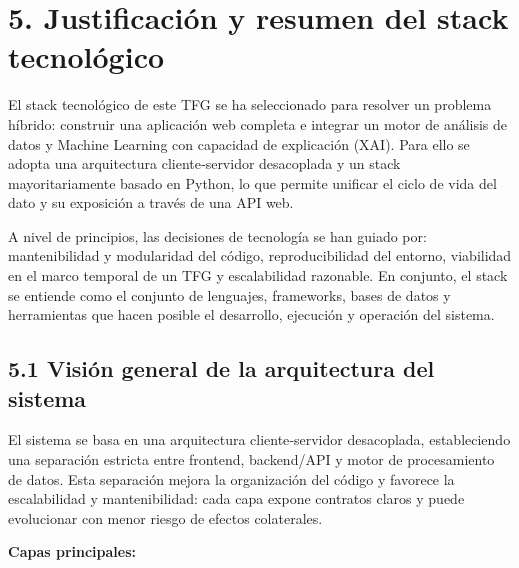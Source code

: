\section*{5. Justificación y resumen del stack tecnológico}

El stack tecnológico de este TFG se ha seleccionado para resolver un problema 
híbrido: construir una aplicación web completa e
integrar un motor de análisis de datos y Machine Learning con capacidad de 
explicación (XAI). Para ello se adopta una arquitectura cliente‑servidor desacoplada 
y un stack mayoritariamente basado en Python, lo que permite unificar el ciclo de 
vida del dato y su exposición a través de 
una API web.

A nivel de principios, las decisiones de tecnología se han guiado por: 
mantenibilidad y modularidad del código, reproducibilidad del entorno, 
viabilidad en el marco temporal de un TFG y escalabilidad razonable. En 
conjunto, el stack se entiende como el conjunto de lenguajes, frameworks, bases 
de datos y herramientas que hacen posible el desarrollo, ejecución y operación 
del sistema.

\subsection{5.1 Visión general de la arquitectura del sistema}

El sistema se basa en una arquitectura cliente‑servidor desacoplada, estableciendo 
una separación estricta entre frontend, backend/API y motor de procesamiento de 
datos. Esta separación mejora la organización del código y favorece la escalabilidad 
y mantenibilidad: cada capa expone contratos claros y puede evolucionar con menor 
riesgo de efectos colaterales.

\textbf{Capas principales:}


